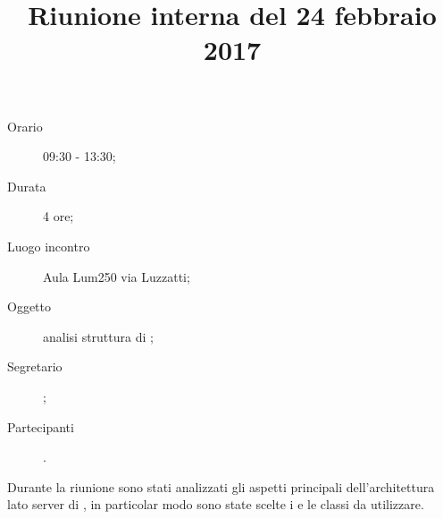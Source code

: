 


\author{\LS}
\title{Riunione interna del 24 febbraio 2017}



\maketitle

\begin{description}
	\item[Orario] 09:30 - 13:30;
	\item[Durata] 4 ore;
	\item[Luogo incontro] Aula Lum250 via Luzzatti;
	\item[Oggetto] analisi struttura  di \proj{};
	\item[Segretario] \LS; 
	\item[Partecipanti] \ALL.
\end{description}
Durante la riunione sono stati analizzati gli aspetti principali dell'architettura lato server di \proj{}, in particolar modo sono state scelte i  e le classi da utilizzare.

